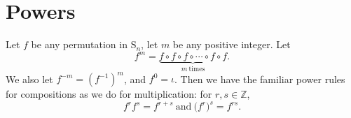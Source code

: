 \documentclass[11pt,dvipsnames]{book}
\numberwithin{figure}{section} %
\numberwithin{table}{section} %
\begin{document}
%
%
%
%
%
%





\section{Powers}

 Let $f$ be any permutation in $\mathrm{S}_n$,  let
$m$ be any positive integer.  Let
$$
f^{m}=\underbrace{f\circ f\circ f\circ\cdots\circ f\circ f}_{m\ \mathrm{times}}.%
$$
We also let $f^{-m}=(f^{-1})^m$,  and $f^{0}=\iota$. Then we have the familiar power rules for compositions as we do for multiplication: for $r,s\in\mathbb{Z}$,
$$
f^{r}f^{s}=f^{r+s}\  \text{and}\  \Big(f^{r}\Big)^{s}=f^{rs}.
$$
\end{document}
